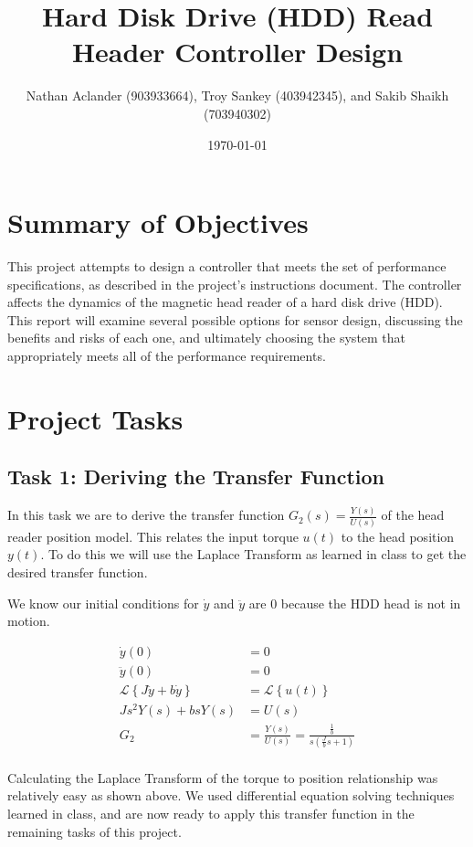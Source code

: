 \documentclass{article}
\title{Hard Disk Drive (HDD) Read Header Controller Design}
\date{\today}
\author{Nathan Aclander (903933664), Troy Sankey (403942345), 
and Sakib Shaikh (703940302)}
\begin{document}
\maketitle
\newpage

\section*{Summary of Objectives}

This project attempts to design a controller that meets the set of performance
specifications, as described in the project's instructions document. The
controller affects the dynamics of the magnetic head reader of a hard disk drive
(HDD). This report will examine several possible options for sensor design,
discussing the benefits and risks of each one, and ultimately choosing the
system that appropriately meets all of the performance requirements.


\section*{Project Tasks}
\subsection*{Task 1: Deriving the Transfer Function}

In this task we are to derive the transfer function $G_2(s) =
\frac{Y(s)}{U(s)}$ of the head reader position model. This relates the
input torque $u(t)$ to the head position $y(t)$. To do this we will
use the Laplace Transform as learned in class to get the desired
transfer function.

We know our initial conditions for $\dot{y}$ and $\ddot{y}$ are $0$
because the HDD head is not in motion.

\begin{align*}
  \dot{y}(0) &= 0 \\
  \ddot{y}(0) &= 0 \\
  \mathcal{L}\left\{ J\ddot{y} + b \dot{y}\right\} &= \mathcal{L}\left\{u(t)\right\} \\
  Js^2 Y(s) + bsY(s) &= U(s) \\
  G_2 &= \frac{Y(s)}{U(s)} = \frac{\frac{1}{b}}{s(\frac{J}{b}s + 1)} \\
\end{align*}

Calculating the Laplace Transform of the torque to position
relationship was relatively easy as shown above. We used differential
equation solving techniques learned in class, and are now ready to
apply this transfer function in the remaining tasks of this project.
\end{document}
